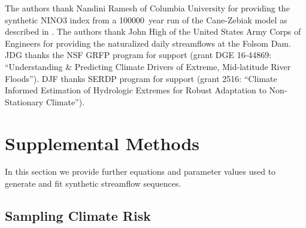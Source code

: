 \documentclass[
]{agujournal2018}
\begin{document}

\acknowledgments

The authors thank Nandini Ramesh of Columbia University for providing the synthetic NINO3 index from a \SI{100000}{year} run of the Cane-Zebiak model as described in \citet{Ramesh:2016hf}.
The authors thank John High of the United States Army Corps of Engineers for providing the naturalized daily streamflows at the Folsom Dam.
JDG thanks the NSF GRFP program for support (grant DGE 16-44869: ``Understanding \& Predicting Climate Drivers of Extreme, Mid-latitude River Floods'').
DJF thanks SERDP program for support (grant 2516: ``Climate Informed Estimation of Hydrologic Extremes for Robust Adaptation to Non-Stationary Climate'').




\clearpage
\appendix

\renewcommand{\thefigure}{S\arabic{figure}}
\setcounter{figure}{0}
\renewcommand{\theequation}{S\arabic{equation}}
\setcounter{equation}{0}
\renewcommand{\thetable}{S\arabic{table}}
\setcounter{table}{0}

\section{Supplemental Methods}\label{sec:supp-methods}

In this section we provide further equations and parameter values used to generate and fit synthetic streamflow sequences.

\subsection{Sampling Climate Risk}\label{sec:supp-nino-spectrum}
\end{document}
